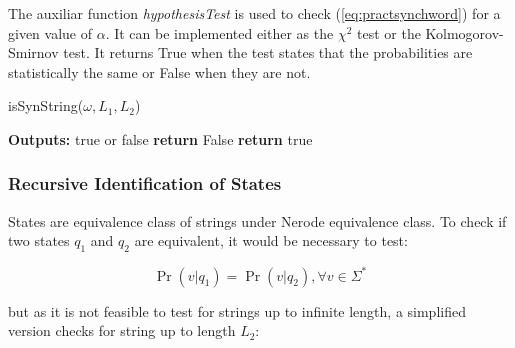{The auxiliar function \textit{hypothesisTest} is used to check (\ref{eq:practsynchword}) for a given value of $\alpha$. It can be implemented either as the $\chi^2$ test or the Kolmogorov-Smirnov test. It returns True when the test states that the probabilities are statistically the same or False when they are not.
  
\begin{algorithm}[b]
\caption{isSynString($\omega, L_1, L_2$)\label{alg:issynstring}}
	\begin{algorithmic}[1]
	\State \textbf{Outputs:} true or false
						\State \textbf{return} False
					\EndIf
				\EndFor
			\EndFor
		\EndFor
	\EndFor
	\State \textbf{return} true
	\end{algorithmic}
\end{algorithm}

\subsubsection{Recursive Identification of States}

States are equivalence class of strings under Nerode equivalence class. To check if two states $q_1$ and $q_2$ are equivalent, it would be necessary to test:

\begin{equation}\label{eq:classeqprob}
\Pr(v|q_1) = \Pr(v|q_2), \forall v \in \Sigma^*
\end{equation}

\noindent but as it is not feasible to test for strings up to infinite length, a simplified version checks for string up to length $L_2$:

%
%

}
